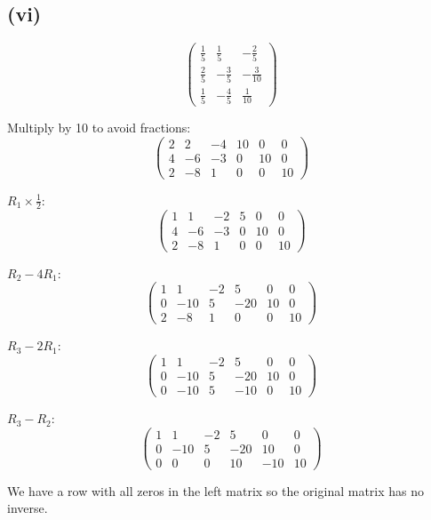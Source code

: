 \subsection*{(vi)}
\[
	\begin{pmatrix}
		\frac{1}{5} & \frac{1}{5}  & -\frac{2}{5}  \\
		\frac{2}{5} & -\frac{3}{5} & -\frac{3}{10} \\
		\frac{1}{5} & -\frac{4}{5} & \frac{1}{10}
	\end{pmatrix}
\]

Multiply by 10 to avoid fractions:
\[
	\begin{pmatrix}
		2 & 2  & -4 & 10 & 0  & 0  \\
		4 & -6 & -3 & 0  & 10 & 0  \\
		2 & -8 & 1  & 0  & 0  & 10
	\end{pmatrix}
\]

$R_1 \times \frac{1}{2}$:
\[
	\begin{pmatrix}
		1 & 1  & -2 & 5 & 0  & 0  \\
		4 & -6 & -3 & 0 & 10 & 0  \\
		2 & -8 & 1  & 0 & 0  & 10
	\end{pmatrix}
\]

$R_2 - 4R_1$:
\[
	\begin{pmatrix}
		1 & 1   & -2 & 5   & 0  & 0  \\
		0 & -10 & 5  & -20 & 10 & 0  \\
		2 & -8  & 1  & 0   & 0  & 10
	\end{pmatrix}
\]

$R_3 - 2R_1$:
\[
	\begin{pmatrix}
		1 & 1   & -2 & 5   & 0  & 0  \\
		0 & -10 & 5  & -20 & 10 & 0  \\
		0 & -10 & 5  & -10 & 0  & 10
	\end{pmatrix}
\]

$R_3 - R_2$:
\[
	\begin{pmatrix}
		1 & 1   & -2 & 5   & 0  & 0  \\
		0 & -10 & 5  & -20 & 10 & 0  \\
		0 & 0   & 0  & 10  & -10 & 10
	\end{pmatrix}
\]

We have a row with all zeros in the left matrix so the original matrix has no inverse.